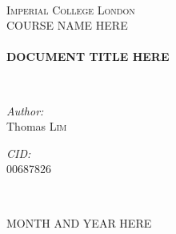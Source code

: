 \documentclass[main.tex]{subfiles}
\begin{document}
\begin{titlepage}
\begin{center}

~\\[2cm]
\textsc{\LARGE Imperial College London}\\[0.5cm]
\textsc{\Large COURSE NAME HERE}\\[0.5cm]

\HRule \\[0.4cm]
{ \huge \bfseries DOCUMENT TITLE HERE \\[0.4cm] }

\HRule \\[1cm]

\begin{minipage}{0.5\textwidth}
\begin{flushleft} \large
\emph{Author:}\\
Thomas \textsc{Lim}
\end{flushleft}
\end{minipage}
\begin{minipage}{0.4\textwidth}
\begin{flushright} \large
\emph{CID:} \\
00687826
\end{flushright}
\end{minipage}
\\[0.5cm]


\vfill

{\large MONTH AND YEAR HERE}

\end{center}
\end{titlepage}
\end{document}
